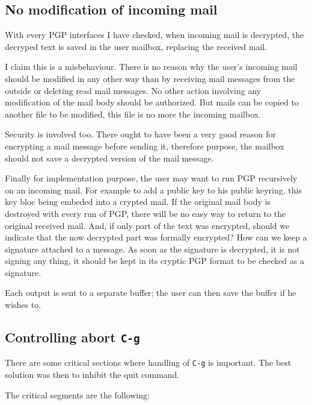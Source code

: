 \subsection{No modification of incoming mail}

With  every PGP interfaces  I  have  checked,  when incoming  mail  is
decrypted, the  decryped text is  saved in the user mailbox, replacing
the received mail.

I  claim this is  a  misbehaviour. There is no  reason  why the user's
incoming mail should  be modified in any other  way than  by receiving
mail  messages from the outside  or deleting read   mail messages.  No
other action involving  any modification of  the  mail body should  be
authorized. But mails  can be copied to another  file  to be modified,
this file is no more the incoming mailbox.

Security is involved too.  There ought to have been a very good reason
for  encrypting a mail message before   sending it, therefore purpose,
the mailbox should not save a decrypted version of the mail message.

Finally  for implementation  purpose,  the user  may want  to  run PGP
recursively  on an incoming  mail. For example  to add a public key to
his public keyring, this key  bloc being embeded  into a crypted mail.
If the original mail body  is destroyed with every  run of PGP,  there
will be no easy way to return to the  original received mail.  And, if
only part of the  text was encrypted,  should we indicate that the now
decrypted part  was formally encrypted?  How  can  we keep a signature
attached to a message.  As  soon as the  signature is decrypted, it is
not signing any thing, it should be kept in  its cryptic PGP format to
be checked as a signature.

Each output is sent to  a separate buffer; the user  can then save the
buffer if he wishes to.

\subsection{Controlling abort {\tt C-g}}

There  are some   critical sections  where  handling of   {\tt C-g} is
important.   The best  solution    was   then to  inhibit     the quit
command.

The critical segments are the following:

